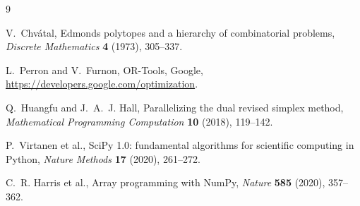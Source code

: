 \documentclass[11pt]{article}
\theoremstyle{definition}
\theoremstyle{remark}
\begin{document}
\begin{thebibliography}{9}

V.~Chv\'atal,
Edmonds polytopes and a hierarchy of combinatorial problems,
\emph{Discrete Mathematics} \textbf{4} (1973), 305--337.

L.~Perron and V.~Furnon,
OR-Tools, Google,
\url{https://developers.google.com/optimization}.

Q.~Huangfu and J.~A.~J. Hall,
Parallelizing the dual revised simplex method,
\emph{Mathematical Programming Computation} \textbf{10} (2018), 119--142.

P.~Virtanen et al.,
SciPy 1.0: fundamental algorithms for scientific computing in Python,
\emph{Nature Methods} \textbf{17} (2020), 261--272.

C.~R. Harris et al.,
Array programming with NumPy,
\emph{Nature} \textbf{585} (2020), 357--362.

\end{thebibliography}
\end{document}
